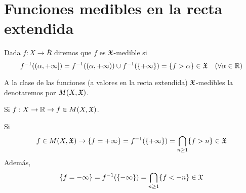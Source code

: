 \section{Funciones medibles en la recta extendida}

\begin{definition}
    Dada $f: X \to \overline{R}$ diremos que $f$ es $\mathfrak{X}$-medible si
    \begin{equation*}
        f^{-1}((\alpha, +\infty]) = f^{-1}((\alpha, +\infty)) \cup f^{-1}(\{ +\infty \}) = \{ f > \alpha \} \in \mathfrak{X} \quad (\forall \alpha \in \mathbb{R})
    \end{equation*}
\end{definition}

A la clase de las funciones (a valores en la recta extendida) $\mathfrak{X}$-medibles la denotaremos por $M(X, \mathfrak{X})$.

\begin{note}
    Si $f: X \to \mathbb{R} \to f \in M(X, \mathfrak{X})$.
\end{note}

\begin{note}
    Si \begin{equation*}f \in M(X, \mathfrak{X}) \to \{ f = +\infty \} = f^{-1}(\{ +\infty \}) = \bigcap_{n \geq 1} \{ f > n \} \in \mathfrak{X}\end{equation*}
    Además, \begin{equation*}\{ f = -\infty \} = f^{-1}(\{ -\infty \}) = \bigcap_{n \geq 1} \{ f < -n \} \in \mathfrak{X}\end{equation*}
\end{note}

